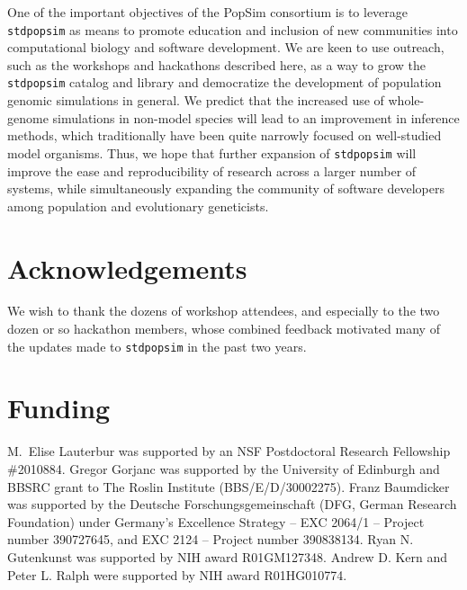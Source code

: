 \documentclass[hidelinks]{article}
\newcommand{\stdpopsim}{\texttt{stdpopsim}\xspace}
\begin{document}
One of the important objectives of the PopSim consortium is to leverage \stdpopsim as means to promote education and inclusion of new communities into
computational biology and software development.
We are keen to use outreach, such as the workshops and hackathons described here, 
as a way to grow the \stdpopsim catalog and library and
democratize the development of population genomic simulations in general.
We predict that the increased use of whole-genome simulations in non-model species will lead to an improvement in inference methods,
which traditionally have been quite narrowly focused on well-studied model organisms.
Thus, we hope that further expansion of \stdpopsim will improve the ease and reproducibility of research across a larger number of systems,
while simultaneously expanding the community of software developers among population and evolutionary geneticists.


\section*{Acknowledgements}\label{acknowledgements}

We wish to thank the dozens of workshop attendees,
and especially to the two dozen or so hackathon members,
whose combined feedback motivated many of the updates made to \stdpopsim in the past two years.

\section*{Funding}
    \label{funding}

M.~Elise Lauterbur was supported by an NSF Postdoctoral Research Fellowship \#2010884.
Gregor Gorjanc was supported by the University of Edinburgh and BBSRC grant to The Roslin Institute (BBS/E/D/30002275).
Franz Baumdicker was supported by the Deutsche Forschungsgemeinschaft (DFG, German Research Foundation) under Germany’s Excellence Strategy – EXC 2064/1 – Project number 390727645, and EXC 2124 – Project number 390838134.
Ryan N. Gutenkunst was supported by NIH award R01GM127348.
Andrew D. Kern and Peter L. Ralph were supported by NIH award R01HG010774.


\end{document}
